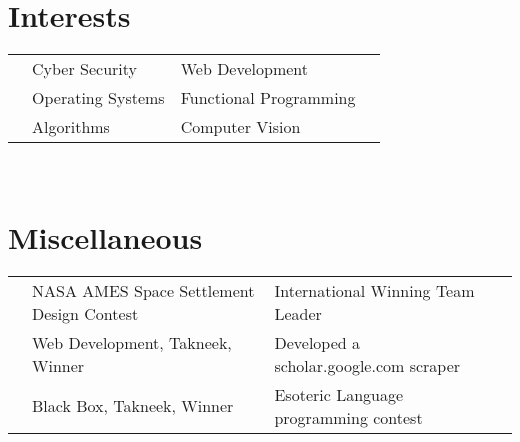 \documentclass[11pt,a4paper]{article}
\begin{document}
\section*{Interests}
\begin{tabular}{L{0.05cm} L{7cm} L{6.5cm} L{7.5cm}}
& Cyber Security    & Web Development\\
& Operating Systems & Functional Programming\\
& Algorithms        & Computer Vision\\
\end{tabular}\\

\section*{Miscellaneous}
\begin{tabular}{L{0.05cm} L{8cm} L{8.5cm} L{8.5cm}}
&NASA AMES Space Settlement Design Contest & International Winning Team Leader\\
&Web Development, Takneek, Winner	  &Developed a scholar.google.com scraper\\
&Black Box, Takneek, Winner         &Esoteric Language programming contest\\
\end{tabular}\\

\
\end{document}
